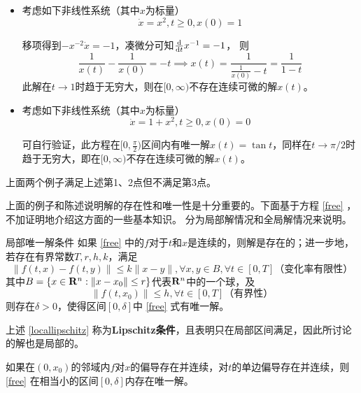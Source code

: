 \begin{example}[时间半轴$[0,\infty)$上不存在解] 
  \begin{itemize}[leftmargin=1em]
    \item 考虑如下非线性系统（其中$x$为标量）
    \begin{equation*}
      \dot{x}=x^2,t\ge 0,x(0)=1
    \end{equation*}

    移项得到$-x^{-2}\dot{x}=-1$，凑微分可知$\frac{\mathop{}\!\mathrm{d}}{\mathop{}\!\mathrm{d} t}x^{-1}=-1$，
    则\[\frac{1}{x(t)}-\frac{1}{x(0)}=-t\implies x(t)=\frac{1}{\frac{1}{x(0)}-t}=\frac{1}{1-t}\]
    此解在$t\to 1$时趋于无穷大，则在$[0,\infty)$不存在连续可微的解$x(t)$。
    \item 考虑如下非线性系统（其中$x$为标量）
    \begin{equation*}
      \dot{x}=1+x^{2},t\ge 0,x(0)=0
    \end{equation*}
  
    可自行验证，此方程在$[0,\frac{\pi}{2})$区间内有唯一解$x(t)=\tan t$，同样在$t\to \pi/2$时趋于无穷大，即在$[0,\infty)$不存在连续可微的解$x(t)$。
  \end{itemize}

  上面两个例子满足上述第1、2点但不满足第3点。
\end{example}

上面的例子和陈述说明解的存在性和唯一性是十分重要的。下面基于方程 \eqref{free} ，不加证明地介绍这方面的一些基本知识。
分为局部解情况和全局解情况来说明。
\begin{theorem}{局部唯一解条件}
如果 \eqref{free} 中的$f$对于$t$和$x$是连续的，则解是存在的；进一步地，若存在有界常数$T,r,h,k$，满足
\begin{equation}\label{locallipschitz}
  \|f(t,x)-f(t,y)\|\le k\|x-y\|,\forall x,y\in B,\forall t\in [0,T]\text{（变化率有限性）}
\end{equation}
其中$B=\{x\in\mathbf{R}{}^n:\|x-x_0\|\le r\}$代表$\mathbf{R}{}^n$中的一个球，及
\begin{equation}
  \|f(t,x_0)\|\le h,\forall t\in [0,T]\text{（有界性）}
\end{equation}
则存在$\delta>0$，使得区间$[0,\delta]$中 \eqref{free} 式有唯一解。
\end{theorem}
上述 \eqref{locallipschitz} 称为{\bf Lipschitz条件}，且表明只在局部区间满足，因此所讨论的解也是局部的。
\begin{corollary}
  如果在$(0,x_0)$的邻域内$f$对$x$的偏导存在并连续，对$t$的单边偏导存在并连续，则 \eqref{free} 在相当小的区间$[0,\delta]$内存在唯一解。
\end{corollary}

